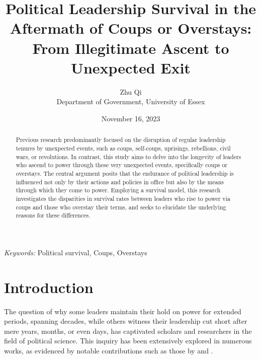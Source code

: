 \documentclass[
  12pt,
  a4paper,
  12pt]{article}
\begin{document}
\def\spacingset#1{\renewcommand{\baselinestretch}%
{#1}\small\normalsize} \spacingset{1}



\date{November 16, 2023}
\title{\bf Political Leadership Survival in the Aftermath of Coups or
Overstays: From Illegitimate Ascent to Unexpected Exit}
\author{
Zhu Qi\\
Department of Government, University of Essex\\
}
\maketitle

\bigskip
\bigskip
\begin{abstract}
Previous research predominantly focused on the disruption of regular
leadership tenures by unexpected events, such as coups, self-coups,
uprisings, rebellions, civil wars, or revolutions. In contrast, this
study aims to delve into the longevity of leaders who ascend to power
through these very unexpected events, specifically coups or overstays.
The central argument posits that the endurance of political leadership
is influenced not only by their actions and policies in office but also
by the means through which they come to power. Employing a survival
model, this research investigates the disparities in survival rates
between leaders who rise to power via coups and those who overstay their
terms, and seeks to elucidate the underlying reasons for these
differences.
\end{abstract}

\noindent%
{\it Keywords:} Political survival, Coups, Overstays
\vfill

\newpage
\spacingset{1.9} %
\ifdefined\Shaded\renewenvironment{Shaded}{\begin{tcolorbox}[interior hidden, breakable, borderline west={3pt}{0pt}{shadecolor}, enhanced, boxrule=0pt, sharp corners, frame hidden]}{\end{tcolorbox}}\fi

\hypertarget{introduction}{%
\section{Introduction}\label{introduction}}

The question of why some leaders maintain their hold on power for
extended periods, spanning decades, while others witness their
leadership cut short after mere years, months, or even days, has
captivated scholars and researchers in the field of political science.
This inquiry has been extensively explored in numerous works, as
evidenced by notable contributions such as those by
\citet{clinton1975politics} and \citet{buenodemesquita2003}.
\end{document}
